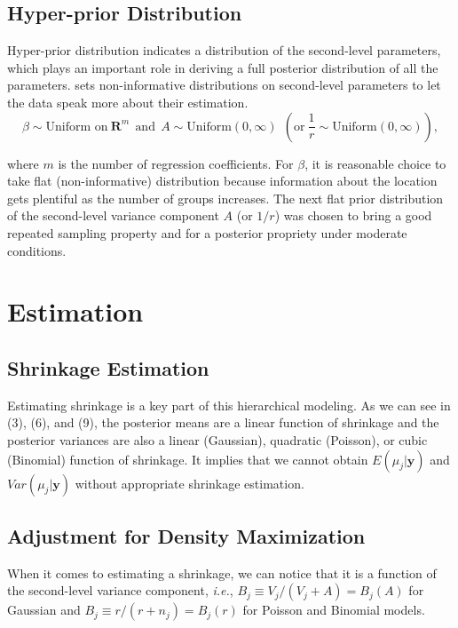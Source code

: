 \documentclass[article]{jss}
\begin{document}
\subsection[Hyper-prior Distribution]{Hyper-prior Distribution}
Hyper-prior distribution indicates a distribution of the second-level parameters, which plays an important role in deriving a full posterior distribution of all the parameters.  sets non-informative distributions on second-level parameters to let the data speak more about their estimation.
\begin{equation}
\beta \sim \textrm{Uniform on}~ \mathbf{R}^{m}~~\textrm{and}~~A \sim \textrm{Uniform}(0, \infty) ~~(\textrm{or} ~\frac{1}{r}\sim \textrm{Uniform}(0, \infty)),
\end{equation}

where $m$ is the number of regression coefficients. For $\beta$, it is reasonable choice to take flat (non-informative) distribution because information about the location gets plentiful as the number of groups increases. The next flat prior distribution of the second-level variance component $A$ (or $1/r$) was chosen to bring a good repeated sampling property and for a posterior propriety under moderate conditions.
\\

\section[Estimation]{Estimation}

\subsection[Shrinkage Estimation]{Shrinkage Estimation}
Estimating shrinkage is a key part of this hierarchical modeling. As we can see in (3), (6), and (9), the posterior means are a linear function of shrinkage and the posterior variances are also a linear (Gaussian), quadratic (Poisson), or cubic (Binomial) function of shrinkage. It implies that we cannot obtain $E(\mu_{j}\vert \textbf{y})$ and $Var(\mu_{j}\vert \textbf{y})$ without appropriate shrinkage estimation.

\subsection[ADM]{Adjustment for Density Maximization}
When it comes to estimating a shrinkage, we can notice that it is a function of the second-level variance component, \emph{i.e.}, $B_{j}\equiv V_{j}/(V_{j}+A)=B_{j}(A)$ for Gaussian and $B_{j}\equiv r/(r+n_{j})=B_{j}(r)$ for Poisson and Binomial models.
\\
\end{document}
